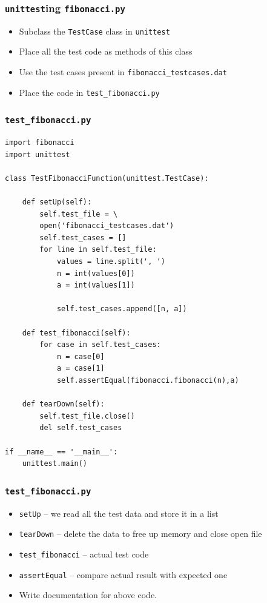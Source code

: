 \documentclass[12pt,presentation]{beamer}
\begin{document}
\begin{frame}[fragile]
  \frametitle{\texttt{unittest}ing \texttt{fibonacci.py}}
  \begin{itemize}
  \item Subclass the \texttt{TestCase} class in \texttt{unittest}
  \item Place all the test code as methods of this class
  \item Use the test cases present in \texttt{fibonacci\_testcases.dat}
  \item Place the code in \texttt{test\_fibonacci.py} 
  \end{itemize}
\end{frame}
\begin{frame}
  \frametitle{\texttt{test\_fibonacci.py}}
\small
\begin{lstlisting}
import fibonacci
import unittest

class TestFibonacciFunction(unittest.TestCase):

    def setUp(self):
        self.test_file = \
        open('fibonacci_testcases.dat')
        self.test_cases = []
        for line in self.test_file:
            values = line.split(', ')
            n = int(values[0])
            a = int(values[1])
            
            self.test_cases.append([n, a])

    def test_fibonacci(self):
        for case in self.test_cases:
            n = case[0]
            a = case[1]
            self.assertEqual(fibonacci.fibonacci(n),a)

    def tearDown(self):
        self.test_file.close()
        del self.test_cases

if __name__ == '__main__':
    unittest.main()
\end{lstlisting}
\end{frame}
\begin{frame}[fragile]
  \frametitle{\texttt{test\_fibonacci.py}}
  \begin{itemize}
  \item \texttt{setUp} -- we read all the test data and store it in a
    list
  \item \texttt{tearDown} -- delete the data to free up memory and
    close open file
  \item \texttt{test\_fibonacci} -- actual test code
  \item \texttt{assertEqual} -- compare actual result with expected one
  \item Write documentation for above code. 
  \end{itemize}
\end{frame}
\end{document}
